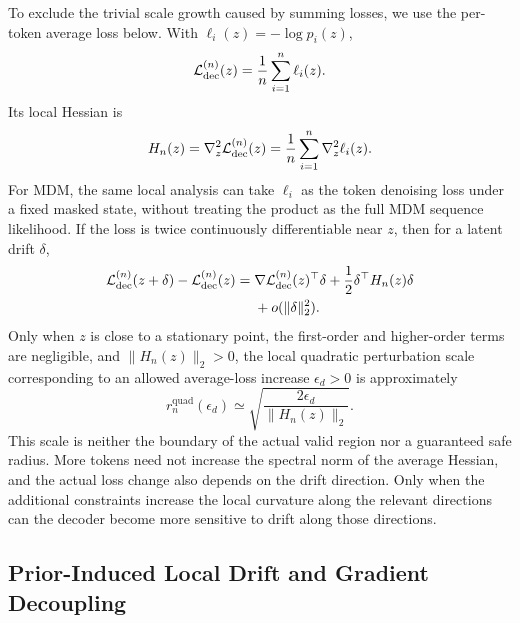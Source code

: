 To exclude the trivial scale growth caused by summing losses, we use the per-token average loss below. With $\ell_i(z)=-\log p_i(z)$,
\begin{equation}
    \mathcal{L}_{\mathrm{dec}}^{(n)}(z)
    =\frac1n\sum_{i=1}^{n}\ell_i(z).
    \label{eq:app-dec-k}
\end{equation}
Its local Hessian is
\begin{equation}
    H_n(z)=\nabla_z^2\mathcal{L}_{\mathrm{dec}}^{(n)}(z)
    =\frac1n\sum_{i=1}^{n}\nabla_z^2\ell_i(z).
    \label{eq:app-hessian-k}
\end{equation}
For MDM, the same local analysis can take $\ell_i$ as the token denoising loss under a fixed masked state, without treating the product as the full MDM sequence likelihood. If the loss is twice continuously differentiable near $z$, then for a latent drift $\delta$,
\begin{equation}
\begin{aligned}
    \mathcal{L}_{\mathrm{dec}}^{(n)}(z+\delta)
    -\mathcal{L}_{\mathrm{dec}}^{(n)}(z)
    ={}&\nabla\mathcal{L}_{\mathrm{dec}}^{(n)}(z)^\top\delta
       +\frac12\delta^\top H_n(z)\delta\\
       &+o(\|\delta\|_2^2).
\end{aligned}
\label{eq:app-dec-drift}
\end{equation}
Only when $z$ is close to a stationary point, the first-order and higher-order terms are negligible, and $\|H_n(z)\|_2>0$, the local quadratic perturbation scale corresponding to an allowed average-loss increase $\epsilon_d>0$ is approximately
\begin{equation}
    r_n^{\mathrm{quad}}(\epsilon_d)
    \simeq\sqrt{\frac{2\epsilon_d}{\|H_n(z)\|_2}}.
    \label{eq:app-safe-radius}
\end{equation}
This scale is neither the boundary of the actual valid region nor a guaranteed safe radius. More tokens need not increase the spectral norm of the average Hessian, and the actual loss change also depends on the drift direction. Only when the additional constraints increase the local curvature along the relevant directions can the decoder become more sensitive to drift along those directions.

\subsection{Prior-Induced Local Drift and Gradient Decoupling}

